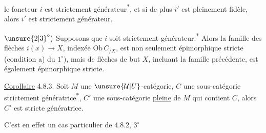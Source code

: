 

le foncteur $i$ est strictement générateur\textsuperscript{$*$}, et si de plus $i'$ est pleinement fidèle, alors $i'$ est strictement générateur.


$\unsure{2|3}^\circ)$ Supposons que $i$ soit strictement générateur.\textsuperscript{$*$} Alors  la famille des flèches $i(x)\longrightarrow X$, indexée  $\mathrm{Ob}\,C_{/X}$, est non seulement épimorphique stricte (condition a) du $1^\circ)$, mais    de flèches de but $X$, incluant la famille précédente, est également épimorphique stricte.



\uline{Corollaire} 4.8.3. Soit $M$ une $\unsure{\mathcal U|U}$-catégorie, $C$ une sous-catégorie strictement génératrice\textsuperscript{$*$}, $C'$ une sous-catégorie \uline{pleine} de $M$ qui contient $C$, alors $C'$ est stricte génératrice.


C'est en effet un cas particulier de 4.8.2, $3^\circ$
